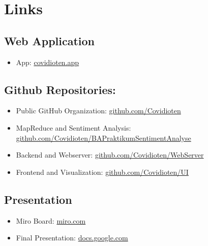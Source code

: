 \documentclass[
    fontsize=12pt,
    headings=small,
    parskip=half,           %
    bibliography=totoc,
    numbers=noenddot,       %
    open=any,               %
    ]{scrreprt}
\begin{document}
\chapter{Links}
\section*{Web Application}
\begin{itemize}
    \item App: \href{https://covidioten.app/#/polit}{covidioten.app}
\end{itemize}
\section*{Github Repositories:}
\begin{itemize}
    \item Public GitHub Organization: \href{https://github.com/Covidioten/}{github.com/Covidioten}
    \item MapReduce and Sentiment Analysis:  \href{https://github.com/Covidioten/BAPraktikumSentimentAnalyse}{github.com/Covidioten/BAPraktikumSentimentAnalyse} 
    \item Backend and Webserver: \href{https://github.com/Covidioten/WebServer}{github.com/Covidioten/WebServer}
    \item Frontend and Visualization: \href{https://github.com/Covidioten/UI}{github.com/Covidioten/UI}
\end{itemize}
\section*{Presentation}
\begin{itemize}
    \item Miro Board: \href{https://miro.com/app/board/o9J_lSwiD0g=/}{miro.com}
    \item Final Presentation: \href{https://docs.google.com/presentation/d/1w5nMCKEQVi0lHkAiSX1hXIUm78zjxiSbUtu0ytRN86I/edit?usp=sharing}{docs.google.com}
\end{itemize}
\end{document}
